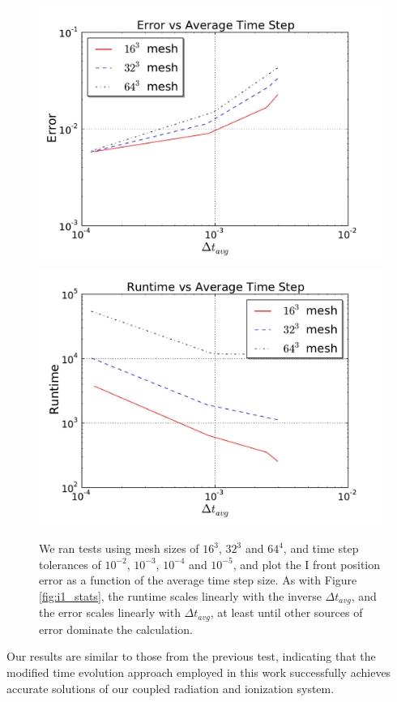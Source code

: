 \begin{figure}[t]
\centerline{\hfill
  \includegraphics[scale=0.45, trim=1.0cm 0.0cm 1.0cm 0.5cm]{sg-error_enzo.pdf}
  \includegraphics[scale=0.45, trim=1.0cm 0.0cm 1.0cm 0.5cm]{sg-runtime_enzo.pdf}
  \hfill}
  \caption{We ran tests using mesh sizes of
    $16^3$, $32^3$ and $64^4$, and time step tolerances of
    $10^{-2}$, $10^{-3}$, $10^{-4}$ and $10^{-5}$, and plot the I
    front position error as a function of the average time step size.
    As with Figure \ref{fig:i1_stats}, the runtime scales linearly
    with the inverse $\Delta t_{avg}$, and the error scales linearly
    with $\Delta t_{avg}$, at least until other sources of error
    dominate the calculation.} 
  \label{fig:sg_stats}
\end{figure}
Our results are similar to those from the previous test, indicating
that the modified time evolution approach employed in this work
successfully achieves accurate solutions of our coupled radiation and
ionization system.



